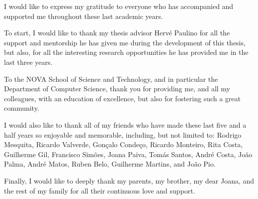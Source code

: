 
%

\begin{ntacknowledgements}




I would like to express my gratitude to everyone who has accompanied and supported me throughout these last academic years.

To start, I would like to thank my thesis advisor Hervé Paulino for all the support and mentorship he has given me during the development of this thesis, but also, for all the interesting research opportunities he has provided me in the last three years.

To the NOVA School of Science and Technology, and in particular the Department of Computer Science, thank you for providing me, and all my colleagues, with an education of excellence, but also for fostering such a great community.

I would also like to thank all of my friends who have made these last five and a half years so enjoyable and memorable, including, but not limited to: Rodrigo Mesquita, Ricardo Valverde, Gonçalo Condeço, Ricardo Monteiro, Rita Costa, Guilherme Gil, Francisco Simões, Joana Paiva, Tomás Santos, André Costa, João Palma, André Matos, Ruben Belo, Guilherme Martins, and João Pio.

Finally, I would like to deeply thank my parents, my brother, my dear Joana, and the rest of my family for all their continuous love and support.

\end{ntacknowledgements}
